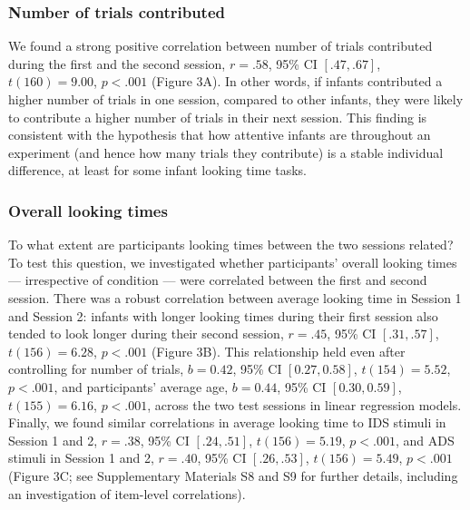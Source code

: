 \documentclass[
  man,floatsintext]{apa6}
\begin{document}
\hypertarget{number-of-trials-contributed}{%
\subsubsection{Number of trials contributed}\label{number-of-trials-contributed}}

We found a strong positive correlation between number of trials contributed during the first and the second session, \(r = .58\), 95\% CI \([.47, .67]\), \(t(160) = 9.00\), \(p < .001\) (Figure 3A).
In other words, if infants contributed a higher number of trials in one session, compared to other infants, they were likely to contribute a higher number of trials in their next session.
This finding is consistent with the hypothesis that how attentive infants are throughout an experiment (and hence how many trials they contribute) is a stable individual difference, at least for some infant looking time tasks.

\hypertarget{overall-looking-times}{%
\subsubsection{Overall looking times}\label{overall-looking-times}}

To what extent are participants looking times between the two sessions related?
To test this question, we investigated whether participants' overall looking times --- irrespective of condition --- were correlated between the first and second session.
There was a robust correlation between average looking time in Session 1 and Session 2: infants with longer looking times during their first session also tended to look longer during their second session, \(r = .45\), 95\% CI \([.31, .57]\), \(t(156) = 6.28\), \(p < .001\) (Figure 3B).
This relationship held even after controlling for number of trials, \(b = 0.42\), 95\% CI \([0.27, 0.58]\), \(t(154) = 5.52\), \(p < .001\), and participants' average age, \(b = 0.44\), 95\% CI \([0.30, 0.59]\), \(t(155) = 6.16\), \(p < .001\), across the two test sessions in linear regression models.
Finally, we found similar correlations in average looking time to IDS stimuli in Session 1 and 2, \(r = .38\), 95\% CI \([.24, .51]\), \(t(156) = 5.19\), \(p < .001\), and ADS stimuli in Session 1 and 2, \(r = .40\), 95\% CI \([.26, .53]\), \(t(156) = 5.49\), \(p < .001\) (Figure 3C; see Supplementary Materials S8 and S9 for further details, including an investigation of item-level correlations).
\end{document}
